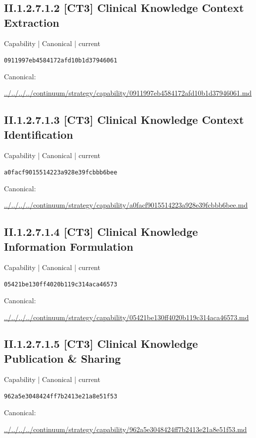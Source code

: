 \documentclass[10pt,a4paper]{article}
\begin{document}
\subsection*{II.1.2.7.1.2 [CT3] Clinical Knowledge Context Extraction}
\label{element-0911997eb4584172afd10b1d37946061}
{\small Capability | Canonical | current}\par
\texttt{0911997eb4584172afd10b1d37946061}\par
Canonical: \par
{\footnotesize\url{../../../../continuum/strategy/capability/0911997eb4584172afd10b1d37946061.md}}\par
\subsection*{II.1.2.7.1.3 [CT3] Clinical Knowledge Context Identification}
\label{element-a0facf9015514223a928e39fcbbb6bee}
{\small Capability | Canonical | current}\par
\texttt{a0facf9015514223a928e39fcbbb6bee}\par
Canonical: \par
{\footnotesize\url{../../../../continuum/strategy/capability/a0facf9015514223a928e39fcbbb6bee.md}}\par
\subsection*{II.1.2.7.1.4 [CT3] Clinical Knowledge Information Formulation}
\label{element-05421be130ff4020b119c314aca46573}
{\small Capability | Canonical | current}\par
\texttt{05421be130ff4020b119c314aca46573}\par
Canonical: \par
{\footnotesize\url{../../../../continuum/strategy/capability/05421be130ff4020b119c314aca46573.md}}\par
\subsection*{II.1.2.7.1.5 [CT3] Clinical Knowledge Publication \& Sharing}
\label{element-962a5e3048424ff7b2413e21a8e51f53}
{\small Capability | Canonical | current}\par
\texttt{962a5e3048424ff7b2413e21a8e51f53}\par
Canonical: \par
{\footnotesize\url{../../../../continuum/strategy/capability/962a5e3048424ff7b2413e21a8e51f53.md}}\par
\end{document}
